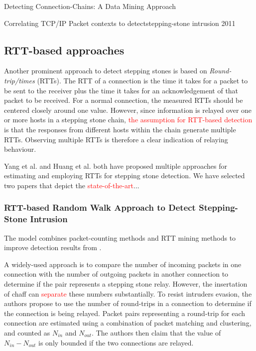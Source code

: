 \documentclass[conference]{IEEEtran}\usepackage[]{graphicx}\usepackage[]{color}
\begin{document}
Detecting Connection-Chains: A Data Mining Approach

Correlating TCP/IP Packet contexts to detectstepping-stone intrusion 2011

\subsection{RTT-based approaches}

Another prominent approach to detect stepping stones is based on \textit{Round-trip/times} (RTTs). The RTT of a connection is the time it takes for a packet to be sent to the receiver plus the time it takes for an acknowledgement of that packet to be received. For a normal connection, the measured RTTs should be centered closely around one value. However, since information is relayed over one or more hosts in a stepping stone chain, \textcolor{red}{the assumption for RTT-based detection} is that the responses from different hosts within the chain generate multiple RTTs. Observing multiple RTTs is therefore a clear indication of relaying behaviour.

Yang et al. \cite{yang2015rtt,yang2007mining} and Huang et al. \cite{huang2016detecting,ding2009detecting,huang2007stepping}  both have proposed multiple approaches for estimating and employing RTTs for stepping stone detection. We have selected two papers that depict the \textcolor{red}{state-of-the-art}...

\subsubsection{RTT-based Random Walk Approach to Detect Stepping-Stone Intrusion \cite{yang2015rtt}}


The model combines packet-counting methods and RTT mining methods to improve detection results from \cite{yang2007mining}. 

A widely-used approach is to compare the number of incoming packets in one connection with the number of outgoing packets in another connection  to determine if the pair represents a stepping stone relay. However, the insertation of chaff can \textcolor{red}{separate} these numbers substantially. 
To resist intruders  evasion,  the authors  propose  to use the  number of  round-trips in  a  connection  to  determine  if  the  connection  is being  relayed.
Packet pairs representing a round-trip for each connection are estimated using a combination of packet matching and clustering, and counted as $N_{in}$ and $N_{out}$. The authors then claim that the value of $N_{in}-N_{out}$ is only bounded if the two connections are relayed.
\end{document}
